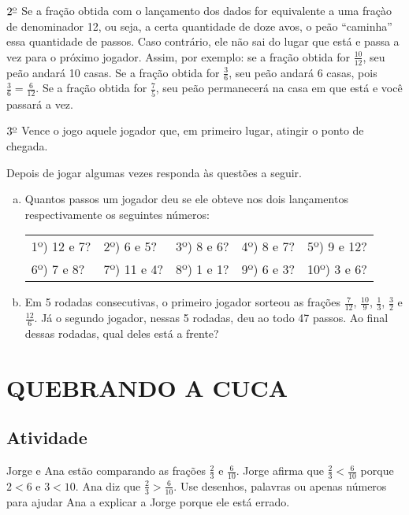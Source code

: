 \documentclass[a4,12pt]{book}
\begin{document}
$2^{\textrm{\underline{o}}}$ Se a fração obtida com o lançamento dos dados for equivalente a uma fraçào de denominador 12, ou seja, a certa quantidade de doze avos, o peão ``caminha'' essa quantidade de passos. Caso contrário, ele não sai do lugar que está e passa a vez para o próximo jogador. Assim, por exemplo: se a fração obtida for $\frac{10}{12}$, seu peão andará 10 casas. Se a fração obtida for $\frac{3}{6}$, seu peão andará $6$ casas, pois $\frac{3}{6} = \frac{6}{12}$. Se a fração obtida for $\frac{7}{5}$, seu peão permanecerá na casa em que está e você passará a vez.

$3^{\textrm{\underline{o}}}$ Vence o jogo aquele jogador que, em primeiro lugar, atingir o ponto de chegada. 

Depois de jogar algumas vezes responda às questões a seguir. 


\begin{enumerate}[a)]
 \item Quantos passos um jogador deu se ele obteve nos dois lançamentos respectivamente os seguintes números:

 \noindent \begin{tabular}{m{}m{}m{}m{}m{}}
1º) 12 e 7?  & 2º) 6 e 5? & 3º) 8 e 6? & 4º) 8 e 7? & 5º) 9 e 12? \\
6º) 7 e 8? & 7º) 11 e 4? & 8º) 1 e 1? & 9º) 6 e 3? & 10º) 3 e 6?
\end{tabular}

\item   Em 5 rodadas consecutivas, o primeiro jogador sorteou as frações  $\frac{7}{12}$, $\frac{10}{9}$, $\frac{1}{3}$, $\frac{3}{2}$  e  $\frac{12}{6}$. Já o segundo jogador, nessas 5 rodadas, deu ao todo 47 passos. Ao final dessas rodadas, qual deles está a frente? 
\end{enumerate}



\section{QUEBRANDO A CUCA }


\subsection{Atividade}

Jorge e Ana estão comparando as frações $\frac{2}{3}$ e $\frac{6}{10}$. Jorge afirma que 
$\frac{2}{3} < \frac{6}{10}$ porque $2 < 6$ e $3 < 10$. Ana diz que $\frac{2}{3} > \frac{6}{10}$. Use desenhos, palavras ou apenas números para ajudar Ana a explicar a Jorge porque ele está errado.
\end{document}
